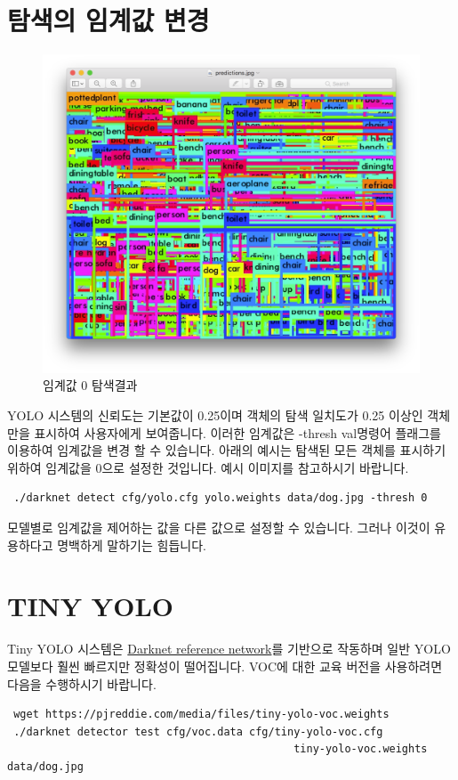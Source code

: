 \documentclass{article}
\begin{document}
\section{탐색의 임계값 변경}
\begin{figure}[h!]
\centering
\includegraphics[scale=0.12]{eximage.png}
\caption{임계값 0 탐색결과 }
\label{fig:eximg}
\end{figure}
YOLO 시스템의 신뢰도는 기본값이 0.25이며 객체의 탐색 일치도가 0.25 이상인 객체만을 표시하여 사용자에게 보여줍니다.
이러한 임계값은 -thresh \textlangle val\textrangle 명령어 플래그를 이용하여 임계값을 변경 할 수 있습니다. 
아래의 예시는 탐색된 모든 객체를 표시하기 위하여 임계값을 0으로 설정한 것입니다. 예시 이미지를 참고하시기 바랍니다.
\begin{lstlisting}
 ./darknet detect cfg/yolo.cfg yolo.weights data/dog.jpg -thresh 0 
\end{lstlisting}
모델별로 임계값을 제어하는 값을 다른 값으로 설정할 수 있습니다. 
그러나 이것이 유용하다고 명백하게 말하기는 힘듭니다.

\section{TINY YOLO}
Tiny YOLO 시스템은 \href{http://khseob0715.dothome.co.kr/YOLO/reference.html}{Darknet reference network}를 기반으로 작동하며 일반 YOLO모델보다 훨씬 빠르지만 정확성이 떨어집니다.
VOC에 대한 교육 버전을 사용하려면 다음을 수행하시기 바랍니다.
\begin{lstlisting}
 wget https://pjreddie.com/media/files/tiny-yolo-voc.weights 
 ./darknet detector test cfg/voc.data cfg/tiny-yolo-voc.cfg 
                                             tiny-yolo-voc.weights data/dog.jpg 
\end{lstlisting}
\end{document}
